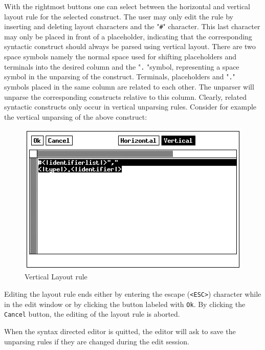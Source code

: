 With the rightmost buttons one can select between the horizontal and
vertical layout rule for the selected construct. The user may only
edit the rule by inserting and deleting layout characters and the
"\verb+#+" character. This last character may only be placed in front
of a placeholder, indicating that the corresponding syntactic
construct should always be parsed using vertical layout. There are
two space symbols namely the normal space used for shifting placeholders
and terminals into the desired column and the "\verb+.+ "symbol, representing
a space symbol in the unparsing of the construct. Terminals, placeholders
and "\verb+.+" symbols placed in the same column are related to each other.
The unparser will unparse the corresponding constructs relative to
this column. Clearly, related syntactic constructs only occur in
vertical unparsing rules. Consider for example the vertical unparsing
of the above construct:
\begin{figure}[h]
\begin {center}
\includegraphics[bb = 155 300 455 492]{pico4.eps}
\end {center}
\caption {Vertical Layout rule}
\end {figure}

Editing the layout rule ends either by entering the escape (\verb+<ESC>+)
character while in the edit window or by clicking the button labeled with
{\tt Ok}. By clicking the {\tt Cancel} button, the editing of the
layout rule is aborted.

When the syntax directed editor is quitted, the editor will ask
to save the unparsing rules if they are changed during the edit session.
